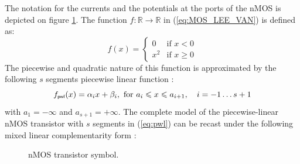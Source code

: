  The notation for the currents and the potentials at the ports of the nMOS is depicted on figure \ref{fig:NMOS}. The function $f :\mathbb{R} \longrightarrow \mathbb{R}$ in (\ref{eq:MOS_LEE_VAN}) is defined as:
\[
f(x) = \left\{ \begin{array}{ll}
0 & \textrm{if $x < 0$}\\
x^2 & \textrm{if $x \geq 0$}
\end{array} \right.
\]
The piecewise and quadratic nature of this function is approximated by the following $s$ segments piecewise linear function \cite{leenaerts-bokhoven1998}: 
\begin{equation}\label{eq:pwl}
  f_\pwl(x) = \alpha_i x + \beta_i, \text{ for } a_i \leq x \leq a_{i+1}, \quad i = -1\ldots s+1
\end{equation}
with $a_1 = -\infty$ and $a_{s+1} = +\infty$. The complete model of the piecewise-linear nMOS transistor with $s$ segments in (\ref{eq:pwl}) can be recast under the following mixed linear complementarity form \cite{leenaerts-bokhoven1998}:
\begin{figure}
  \centering
  
  \caption{nMOS transistor symbol.}
  \label{fig:NMOS}
\end{figure}


